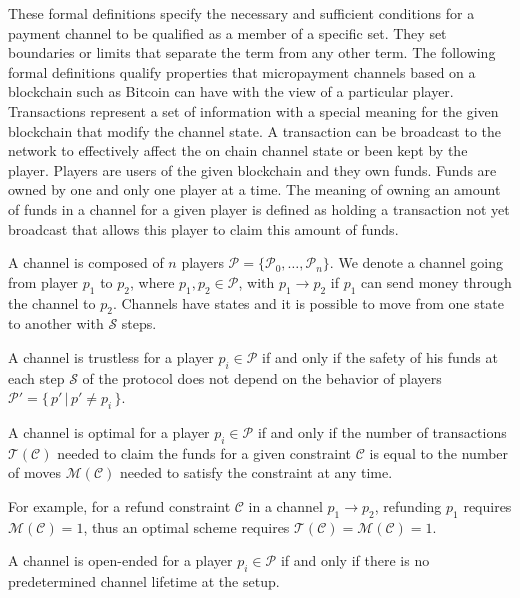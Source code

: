 \documentclass{llncs}
\begin{document}
These formal definitions specify the necessary and sufficient conditions for a payment channel to be qualified as a member of a specific set. They set boundaries or limits that separate the term from any other term. The following formal definitions qualify properties that micropayment channels based on a blockchain such as Bitcoin can have with the view of a particular player.  Transactions represent a set of information with a special meaning for the given blockchain that modify the channel state. A transaction can be broadcast to the network to effectively affect the on chain channel state or been kept by the player. Players are users of the given blockchain and they own funds. Funds are owned by one and only one player at a time. The meaning of owning an amount of funds in a channel for a given player is defined as holding a transaction not yet broadcast that allows this player to claim this amount of funds.

A channel is composed of $n$ players $\mathcal{P} = \{\mathcal{P}_0, \dots, \mathcal{P}_n\}$. We denote a channel going from player $p_1$ to $p_2$, where $p_1, p_2 \in \mathcal{P}$, with $p_1 \rightarrow p_2$ if $p_1$ can send money through the channel to $p_2$. Channels have states and it is possible to move from one state to another with $\mathcal{S}$ steps.

\begin{definition}[Trustless] A channel is trustless for a player $p_i \in \mathcal{P}$ if and only if the safety of his funds at each step $\mathcal{S}$ of the protocol does not depend on the behavior of players $\mathcal{P}' = \{\, p' \, | \, p' \neq p_i \, \}$.
\end{definition}

\begin{definition}[Optimal] A channel is optimal for a player $p_i \in \mathcal{P}$ if and only if the number of transactions $\mathcal{T}(\mathcal{C})$ needed to claim the funds for a given constraint $\mathcal{C}$ is equal to the number of moves $\mathcal{M}(\mathcal{C})$ needed to satisfy the constraint at any time.
\end{definition}

For example, for a refund constraint $\mathcal{C}$ in a channel $p_1 \rightarrow p_2$, refunding $p_1$ requires $\mathcal{M}(\mathcal{C}) = 1$, thus an optimal scheme requires $\mathcal{T}(\mathcal{C}) = \mathcal{M}(\mathcal{C}) = 1$.

\begin{definition} A channel is open-ended for a player $p_i \in \mathcal{P}$ if and only if there is no predetermined channel lifetime at the setup.
\end{definition}
\end{document}
